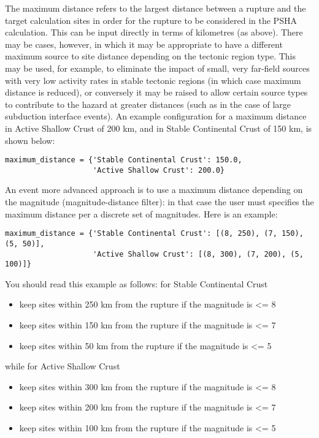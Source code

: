 The maximum distance refers to the largest distance between a rupture and the
target calculation sites in order for the rupture to be considered in the PSHA
calculation. This can be input directly in terms of kilometres (as above).
There may be cases, however, in which it may be appropriate to have a
different maximum source to site distance depending on the tectonic region
type. This may be used, for example, to eliminate the impact of small, very
far-field sources with very low activity rates in stable tectonic regions (in
which case maximum distance is reduced), or conversely it may be raised to
allow certain source types to contribute to the hazard at greater distances
(such as in the case of large subduction interface events). An example
configuration for a maximum distance in Active Shallow Crust of 200 km, and in
Stable Continental Crust of 150 km, is shown below:

\begin{verbatim}
maximum_distance = {'Stable Continental Crust': 150.0,
                    'Active Shallow Crust': 200.0}
\end{verbatim}

An event more advanced approach is to use a maximum distance depending on the
magnitude (magnitude-distance filter): in that case the user must specifies
the maximum distance per a discrete set of magnitudes. Here is an
example:

\begin{verbatim}
maximum_distance = {'Stable Continental Crust': [(8, 250), (7, 150), (5, 50)],
                    'Active Shallow Crust': [(8, 300), (7, 200), (5, 100)]}
\end{verbatim}

You should read this example as follows: for Stable Continental Crust

\begin{itemize}
\item keep sites within 250 km from the rupture if the magnitude is <= 8
\item keep sites within 150 km from the rupture if the magnitude is <= 7
\item keep sites within 50 km from the rupture if the magnitude is <= 5
\end{itemize}

while for Active Shallow Crust

\begin{itemize}
\item keep sites within 300 km from the rupture if the magnitude is <= 8
\item keep sites within 200 km from the rupture if the magnitude is <= 7
\item keep sites within 100 km from the rupture if the magnitude is <= 5
\end{itemize}

